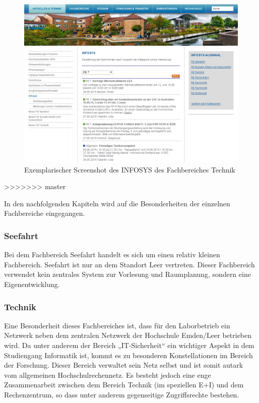 \begin{figure}[h!]
	\centering
	\includegraphics[width=14cm]{kapitel/gruppe2/bilder/InfoSys}
	\caption{Exemplarischer Screenshot des INFOSYS des Fachbereiches Technik}
	\label{fig_InfoSys}
\end{figure}
>>>>>>> master

In den nachfolgenden Kapiteln wird auf die Besonderheiten der einzelnen Fachbereiche eingegangen.

\subsubsection{Seefahrt}
Bei dem Fachbereich Seefahrt handelt es sich um einen relativ kleinen Fachbereich. Seefahrt ist  nur an dem Standort Leer vertreten. Dieser Fachbereich verwendet kein zentrales System zur Vorlesung und Raumplanung, sondern eine Eigenentwicklung.

\subsubsection{Technik}
Eine Besonderheit dieses Fachbereiches ist, dass für den Laborbetrieb ein Netzwerk neben dem zentralen Netzwerk der Hochschule Emden/Leer betrieben wird. Da unter anderem der Bereich „IT-Sicherheit“ ein wichtiger Aspekt in dem Studiengang Informatik ist, kommt es zu besonderen Konstellationen im Bereich der Forschung. Dieser Bereich verwaltet sein Netz selbst und ist somit autark vom allgemeinen Hochschulrechennetz. Es besteht jedoch eine enge Zusammenarbeit zwischen dem Bereich Technik (im speziellen E+I) und dem Rechenzentrum, so dass unter anderem gegenseitige Zugriffsrechte bestehen. 

